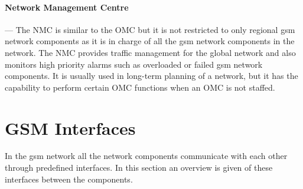 \paragraph{Network Management Centre}
--- The \gls{NMC} is similar to the \gls{OMC} but it is not restricted to only regional \gls{gsm} network components as it is in charge of all the \gls{gsm} network components in the network\cite{GSMSysEngin}. The \gls{NMC} provides traffic management for the global network and also monitors high priority alarms such as overloaded or failed \gls{gsm} network components\cite{GSMSysEngin}. It is usually used in long-term planning of a network, but it has the capability to perform certain \gls{OMC} functions when an \gls{OMC} is not staffed. 

\section{GSM Interfaces}
\label{sec:gsminterfaces}
In the \gls{gsm} network all the network components communicate with each other through predefined interfaces. In this section an overview is given of these interfaces between the components.

